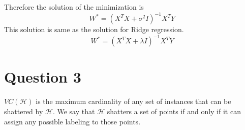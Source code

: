 \documentclass{article}
\begin{document}
Therefore the solution of the minimization is 
\begin{equation*}
		W^* = (X^TX + \sigma^2I)^{-1}X^TY
\end{equation*}
This solution is same as the solution for Ridge regression.
\begin{equation*}
	W^* = (X^TX  + \lambda I)^{-1}X^TY
\end{equation*}

\section*{Question 3}

$VC(\mathcal{H})$ is the maximum cardinality of any set of instances that can be shattered by $\mathcal{H}$. We say that $\mathcal{H}$ shatters a set of points if and only if it can assign any possible labeling to those points.
\end{document}

